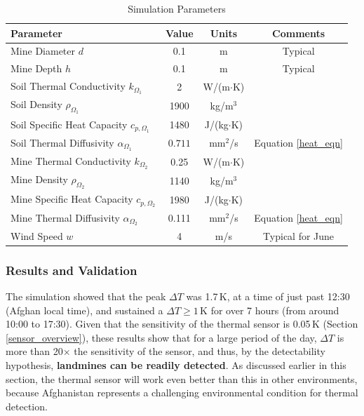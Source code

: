         \begin{table}[ht]
        \centering
        \caption{Simulation Parameters}
        \label{tab:properties}
        \begin{tabular}{lccc}
        \hline
        \textbf{Parameter} & \textbf{Value} & \textbf{Units} & \textbf{Comments}\\
        \hline
        Mine Diameter \(d\)       & 0.1     & m    & Typical\\
        Mine Depth \(h\)          & 0.1   & m    & Typical\\
        Soil Thermal Conductivity $k_{\Omega_1}$ & 2  & W/(m$\cdot$K) & \cite{szymanik2011soil}\\
        Soil Density $\rho_{\Omega_1}$     & 1900     & kg/m$^3$ & \cite{szymanik2011soil}\\
        Soil Specific Heat Capacity $c_{p,{\Omega_1}}$  & 1480     & J/(kg$\cdot$K) & \cite{szymanik2011soil}\\
        Soil Thermal Diffusivity $\alpha_{\Omega_1}$ & $0.711$ & mm$^2$/s    & Equation \ref{heat_eqn}\\
        Mine Thermal Conductivity $k_{\Omega_2}$ & 0.25  & W/(m$\cdot$K) & \cite{szymanik2011soil}\\
        Mine Density $\rho_{\Omega_2}$      & 1140     & kg/m$^3$ & \cite{szymanik2011soil}\\
        Mine Specific Heat Capacity $c_{p,{\Omega_2}}$ & 1980     & J/(kg$\cdot$K) & \cite{szymanik2011soil}\\
        Mine Thermal Diffusivity $\alpha_{\Omega_2}$ & 0.111 & mm$^2$/s    & Equation \ref{heat_eqn}\\
        Wind Speed \(w\)          & 4      & m/s  & Typical for June \tablefootnote{\url{https://weather-and-climate.com/average-monthly-Wind-speed,Kabul,Afghanistan}}\\
        \hline
        \end{tabular}
        \end{table}

   


    \subsubsection{Results and Validation} \label{Results and Validation}
    
         The simulation showed that the peak \(\Delta T\) was 1.7\,K, at a time of just past 12:30 (Afghan local time), and sustained a \(\Delta T \geq 1\)\,K for over 7 hours (from around 10:00 to 17:30). Given that the sensitivity of the thermal sensor is 0.05\,K (Section \ref{sensor_overview}), these results show that for a large period of the day, \(\Delta T\) is more than 20$\times$ the sensitivity of the sensor, and thus, by the detectability hypothesis, \textbf{landmines can be readily detected}. As discussed earlier in this section, the thermal sensor will work even better than this in other environments, because Afghanistan represents a challenging environmental condition for thermal detection.
    

